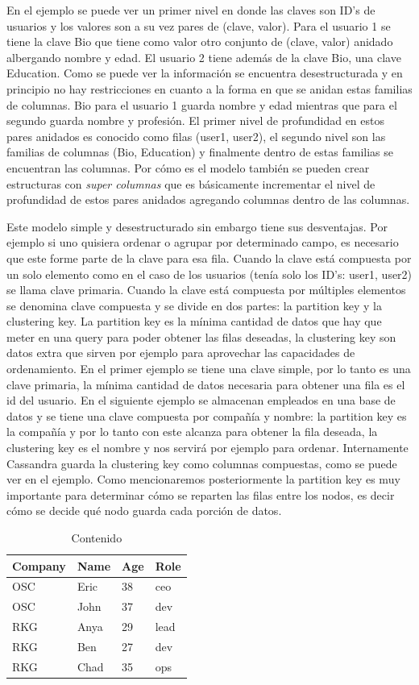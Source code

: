 \documentclass[11pt,a4paper]{article}
\begin{document}
En el ejemplo se puede ver un primer nivel en donde las claves son ID's de usuarios y los valores son a su vez pares de (clave, valor). Para el usuario 1 se tiene la clave Bio que tiene como valor otro conjunto de (clave, valor) anidado albergando nombre y edad. El usuario 2 tiene además de la clave Bio, una clave Education. Como se puede ver la información se encuentra desestructurada y en principio no hay restricciones en cuanto a la forma en que se anidan estas familias de columnas. Bio para el usuario 1 guarda nombre y edad mientras que para el segundo guarda nombre y profesión. El primer nivel de profundidad en estos pares anidados es conocido como filas (user1, user2), el segundo nivel son las familias de columnas (Bio, Education) y finalmente dentro de estas familias se encuentran las columnas. Por cómo es el modelo también se pueden crear estructuras con \textit{super columnas} que es básicamente incrementar el nivel de profundidad de estos pares anidados agregando columnas dentro de las columnas.

Este modelo simple y desestructurado sin embargo tiene sus desventajas. Por ejemplo si uno quisiera ordenar o agrupar por determinado campo, es necesario que este forme parte de la clave para esa fila. Cuando la clave está compuesta por un solo elemento como en el caso de los usuarios (tenía solo los ID's: user1, user2) se llama clave primaria. Cuando la clave está compuesta por múltiples elementos se denomina clave compuesta y se divide en dos partes: la partition key y la clustering key. La partition key es la mínima cantidad de datos que hay que meter en una query para poder obtener las filas deseadas, la clustering key son datos extra que sirven por ejemplo para aprovechar las capacidades de ordenamiento. En el primer ejemplo se tiene una clave simple, por lo tanto es una clave primaria, la mínima cantidad de datos necesaria para obtener una fila es el id del usuario. En el siguiente ejemplo se almacenan empleados en una base de datos y se tiene una clave compuesta por compañía y nombre: la partition key es la compañía y por lo tanto con este alcanza para obtener la fila deseada, la clustering key es el nombre y nos servirá por ejemplo para ordenar. Internamente Cassandra guarda la clustering key como columnas compuestas, como se puede ver en el ejemplo. Como mencionaremos posteriormente la partition key es muy importante para determinar cómo se reparten las filas entre los nodos, es decir cómo se decide qué nodo guarda cada porción de datos.

\begin{table}[h]
\centering
\caption{Contenido}
\label{my-label}
\begin{tabular}{|l|l|l|l|}
\hline
Company & Name & Age & Role \\ \hline
OSC     & Eric & 38  & ceo  \\ \hline
OSC     & John & 37  & dev  \\ \hline
RKG     & Anya & 29  & lead \\ \hline
RKG     & Ben  & 27  & dev  \\ \hline
RKG     & Chad & 35  & ops  \\ \hline
\end{tabular}
\end{table}
\end{document}

